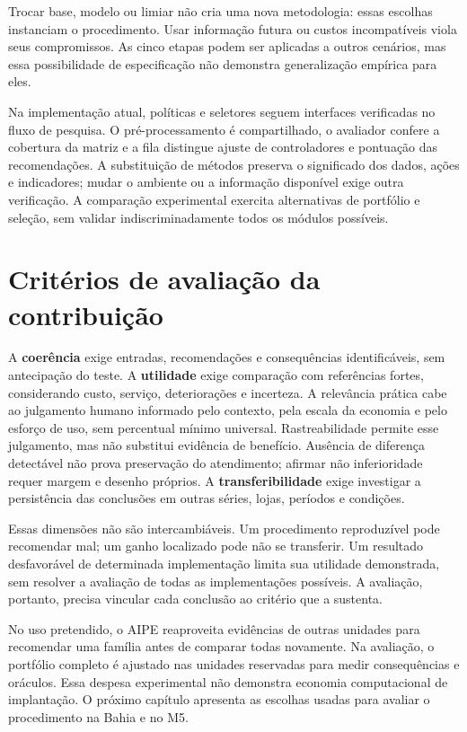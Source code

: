 Trocar base, modelo ou limiar não cria uma nova metodologia: essas escolhas instanciam o procedimento. Usar informação futura ou custos incompatíveis viola seus compromissos. As cinco etapas podem ser aplicadas a outros cenários, mas essa possibilidade de especificação não demonstra generalização empírica para eles.

Na implementação atual, políticas e seletores seguem interfaces verificadas no fluxo de pesquisa. O pré-processamento é compartilhado, o avaliador confere a cobertura da matriz e a fila distingue ajuste de controladores e pontuação das recomendações. A substituição de métodos preserva o significado dos dados, ações e indicadores; mudar o ambiente ou a informação disponível exige outra verificação. A comparação experimental exercita alternativas de portfólio e seleção, sem validar indiscriminadamente todos os módulos possíveis.

\section{Critérios de avaliação da contribuição}
A \textbf{coerência} exige entradas, recomendações e consequências identificáveis, sem antecipação do teste. A \textbf{utilidade} exige comparação com referências fortes, considerando custo, serviço, deteriorações e incerteza. A relevância prática cabe ao julgamento humano informado pelo contexto, pela escala da economia e pelo esforço de uso, sem percentual mínimo universal. Rastreabilidade permite esse julgamento, mas não substitui evidência de benefício. Ausência de diferença detectável não prova preservação do atendimento; afirmar não inferioridade requer margem e desenho próprios. A \textbf{transferibilidade} exige investigar a persistência das conclusões em outras séries, lojas, períodos e condições.

Essas dimensões não são intercambiáveis. Um procedimento reproduzível pode recomendar mal; um ganho localizado pode não se transferir. Um resultado desfavorável de determinada implementação limita sua utilidade demonstrada, sem resolver a avaliação de todas as implementações possíveis. A avaliação, portanto, precisa vincular cada conclusão ao critério que a sustenta.

No uso pretendido, o AIPE reaproveita evidências de outras unidades para recomendar uma família antes de comparar todas novamente. Na avaliação, o portfólio completo é ajustado nas unidades reservadas para medir consequências e oráculos. Essa despesa experimental não demonstra economia computacional de implantação. O próximo capítulo apresenta as escolhas usadas para avaliar o procedimento na Bahia e no M5.
